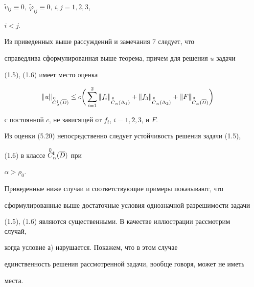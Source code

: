 $\widetilde v_{ij}\equiv 0,\;\widetilde \varphi_{ij}\equiv 0$, $i,j=1,2,3$,


$i<j$.





Из приведенных выше рассуждений и замечания 7 следует, что


справедлива сформулированная выше теорема, причем для решения $u$ задачи


(1.5), (1.6) имеет место оценка




\begin{equation}


\|u\|_{\overset{0}{C}{}_{\alpha}^{\bold{l}}(\overline D)}\leq c\bigg(\sum_{i=


1}^2\|f_i\|_{\overset{0}{C}_{\alpha}(\Delta_1)}+


\|f_3\|_{\overset{0}{C}_{\alpha}(\Delta_2)}+


\|F\|_{\overset{0}{C}_{\alpha}(\overline D)} \bigg)


\end{equation}


с постоянной $c$, не зависящей от $f_i$, $i=1,2,3$, и $F$.





\begin{note}


Из оценки (5.20) непосредственно следует устойчивость решения задачи (1.5),


(1.6) в классе $\overset{0}{C}{}_{\alpha}^{\bold{l}}(\overline D)$ при


$\alpha > \rho_0$.


\end{note}





Приведенные ниже случаи и соответствующие примеры показывают, что


сформулированные выше достаточные условия однозначной разрешимости задачи


(1.5), (1.6) являются существенными. В качестве иллюстрации рассмотрим случай,


когда условие а) нарушается. Покажем, что в этом случае


единственность решения рассмотренной задачи, вообще говоря, может не иметь


места.


\medskip





